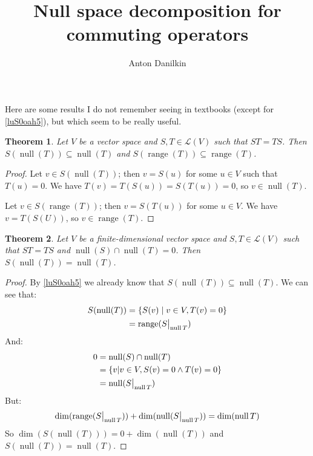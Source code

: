 \documentclass{article}
\author{Anton Danilkin}
\title{Null space decomposition for commuting operators}
\DeclareMathOperator{\nullspace}{null}
\DeclareMathOperator{\range}{range}
\newcommand\restr[2]{{\left.\kern-\nulldelimiterspace #1 \vphantom{\big|} \right|_{#2}}}
\theoremstyle{plain}\newtheorem{theorem}{Theorem}
\theoremstyle{plain}\newtheorem{proposition}{Proposition}
\theoremstyle{remark}\newtheorem{remark}{Remark}
\begin{document}
\maketitle

Here are some results I do not remember seeing in textbooks (except for \autoref{luS0oah5}), but which seem to be really useful.

\begin{theorem}\label{luS0oah5}
    Let $V$ be a vector space and $S, T \in \mathcal{L}(V)$ such that $S T = T S$. Then $S (\nullspace(T)) \subseteq \nullspace(T)$ and $S (\range(T)) \subseteq \range(T)$.
\end{theorem}
\begin{proof}
    Let $v \in S (\nullspace(T))$; then $v = S(u)$ for some $u \in V$ such that $T(u) = 0$. We have $T(v) = T(S(u)) = S(T(u)) = 0$, so $v \in \nullspace(T)$.

    Let $v \in S (\range(T))$; then $v = S(T(u))$ for some $u \in V$. We have $v = T(S(U))$, so $v \in \range(T)$.
\end{proof}

\begin{theorem}\label{aow7aShu}
    Let $V$ be a finite-dimensional vector space and $S, T \in \mathcal{L}(V)$ such that $S T = T S$ and $\nullspace(S) \cap \nullspace(T) = 0$. Then $S (\nullspace(T)) = \nullspace(T)$.
\end{theorem}
\begin{proof}
    By \autoref{luS0oah5} we already know that $S (\nullspace(T)) \subseteq \nullspace(T)$. We can see that:
    \begin{equation*}
        \begin{aligned}
            S(\nullspace(T)) & = \{ S(v) \mid v \in V, T(v) = 0 \} \\
                             & = \range(\restr{S}{\nullspace{T}})  \\
        \end{aligned}
    \end{equation*}
    And:
    \begin{equation*}
        \begin{aligned}
            0 & = \nullspace(S) \cap \nullspace(T)           \\
              & = \{ v | v \in V, S(v) = 0 \land T(v) = 0 \} \\
              & = \nullspace(\restr{S}{\nullspace{T}})       \\
        \end{aligned}
    \end{equation*}
    But:
    \begin{equation*}
        \dim(\range(\restr{S}{\nullspace{T}})) + \dim(\nullspace(\restr{S}{\nullspace{T}})) = \dim(\nullspace{T})
    \end{equation*}
    So $\dim(S(\nullspace(T))) = 0 + \dim(\nullspace(T))$ and $S (\nullspace(T)) = \nullspace(T)$.
\end{proof}
\end{document}
